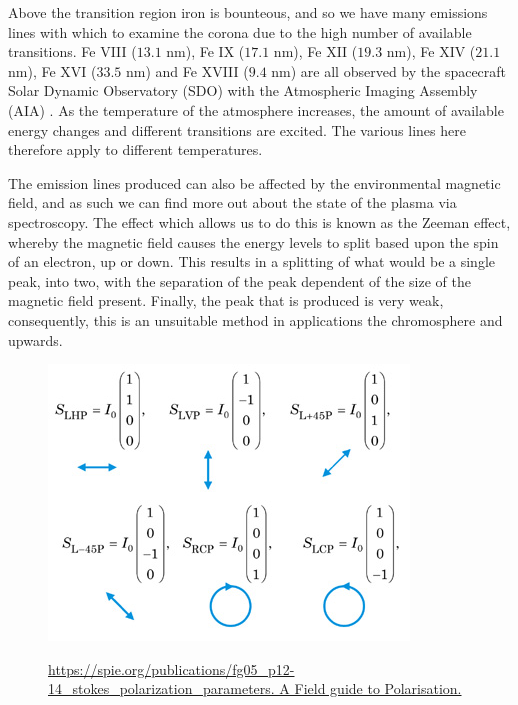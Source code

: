 Above the transition region iron is bounteous, and so we have many emissions lines with which to examine the corona due to the high number of available transitions.
Fe VIII ($13.1$ nm), Fe IX ($17.1$ nm), Fe XII ($19.3$ nm), Fe XIV ($21.1$ nm), Fe XVI ($33.5$ nm) and Fe XVIII ($9.4$ nm) are all observed by the spacecraft Solar Dynamic Observatory (SDO) with the Atmospheric Imaging Assembly (AIA) \cite{Schmelz2013}.
As the temperature of the atmosphere increases, the amount of available energy changes and different transitions are excited.
The various lines here therefore apply to different temperatures.



The emission lines produced can also be affected by the environmental magnetic field, and as such we can find more out about the state of the plasma via spectroscopy.
The effect which allows us to do this is known as the Zeeman effect, whereby the magnetic field causes the energy levels to split based upon the spin of an electron, up or down.
This results in a splitting of what would be a single peak, into two, with the separation of the peak dependent of the size of the magnetic field present.
Finally, the peak that is produced is very weak, consequently, this is an unsuitable method in applications the chromosphere and upwards.


\begin{figure}
	\centering
	\includegraphics[scale=3.5]{Chapter1/Figs/stokes_params}
	\label{stokes}
	\caption{\url{https://spie.org/publications/fg05_p12-14_stokes_polarization_parameters. A Field guide to Polarisation.}}
\end{figure}

